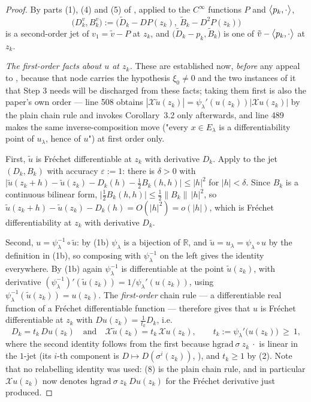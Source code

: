 \begin{proof}
By parts (1), (4) and (5) of , applied to the
$C^{\infty}$ functions $P$ and $\big\langle p_k,\cdot\big\rangle$,
\[
 \big(D^{v}_k,B^{v}_k\big):=\big(\tilde D_k-DP(z_k),\ \tilde B_k-D^{2}P(z_k)\big)
\]
is a second-order jet of $v_1=\tilde v-P$ at $z_k$, and
$\big(\tilde D_k-p_k,\tilde B_k\big)$ is one of $\tilde v-\big\langle p_k,\cdot\big\rangle$ at $z_k$.

\emph{The first-order facts about $u$ at $z_k$.} These are established now, \emph{before}
any appeal to , because that node carries the hypothesis
$\xi_0\ne0$ and the two instances of it that Step 3 needs will be discharged from these
facts; taking them first is also the paper's own order --- line 508 obtains
$|\mathcal X\tilde u(z_k)|=\psi_\lambda'(u(z_k))|\mathcal Xu(z_k)|$ by the plain chain rule
and invokes Corollary~3.2 only afterwards, and line 489 makes the same inverse-composition move
("every $x\in E_\lambda$ is a differentiability point of $u_\lambda$, hence of $u$") at
first order only.

First, $\tilde u$ is Fr\'echet differentiable at $z_k$ with derivative $D_k$. Apply
 to the jet $(D_k,B_k)$ with accuracy $\varepsilon:=1$: there is
$\delta>0$ with
$\big|\tilde u(z_k+h)-\tilde u(z_k)-D_k(h)-\frac12B_k(h,h)\big|\le|h|^{2}$ for $|h|<\delta$.
Since $B_k$ is a continuous bilinear form, $\big|\frac12B_k(h,h)\big|\le\frac12\|B_k\|\,|h|^{2}$,
so $\tilde u(z_k+h)-\tilde u(z_k)-D_k(h)=O(|h|^{2})=o(|h|)$, which is Fr\'echet
differentiability at $z_k$ with derivative $D_k$.

Second, $u=\psi_\lambda^{-1}\circ\tilde u$: by (1b) $\psi_\lambda$ is a bijection of
$\mathbb R$, and $\tilde u=u_\lambda=\psi_\lambda\circ u$ by the definition in (1b), so
composing with $\psi_\lambda^{-1}$ on the left gives the identity everywhere. By (1b) again
$\psi_\lambda^{-1}$ is differentiable at the point $\tilde u(z_k)$, with derivative
$(\psi_\lambda^{-1})'(\tilde u(z_k))=1/\psi_\lambda'(u(z_k))$, using
$\psi_\lambda^{-1}(\tilde u(z_k))=u(z_k)$. The \emph{first-order} chain rule --- a
differentiable real function of a Fr\'echet differentiable function --- therefore gives that
$u$ is Fr\'echet differentiable at $z_k$ with $Du(z_k)=\frac1{t_k}D_k$, i.e.
\[
 D_k=t_k\,Du(z_k)\quad\text{and}\quad
 \mathcal X\tilde u(z_k)=t_k\,\mathcal Xu(z_k),\qquad
 t_k:=\psi_\lambda'\big(u(z_k)\big)\ \ge\ 1 , \tag{8}
\]
where the second identity follows from the first because
$\mathrm{hgrad}\ \sigma\ z_k\ \cdot$ is linear in the $1$-jet (its $i$-th component is
$D\mapsto D(\sigma^{i}(z_k))$, ), and $t_k\ge1$ by
(2). Note that no relabelling identity was used: (8) is the plain
chain rule, and in particular $\mathcal Xu(z_k)$ now denotes
$\mathrm{hgrad}\ \sigma\ z_k\ Du(z_k)$ for the Fr\'echet derivative just produced.


\end{proof}
